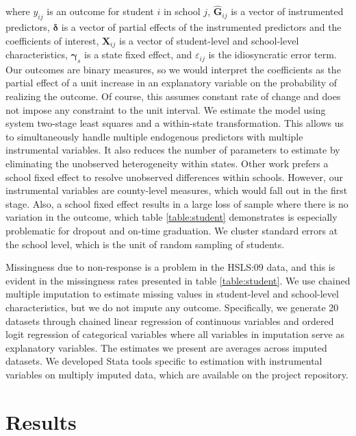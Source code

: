 \documentclass[letterpaper, 12pt]{article}
\begin{document}
where $y_{ij}$ is an outcome for student $i$ in school $j$, $\hat{\mathbf{G}}_{ij}$ is a vector of instrumented predictors, $\boldsymbol{\delta}$ is a vector of partial effects of the instrumented predictors and the coefficients of interest, $\mathbf{X}_{ij}$ is a vector of student-level and school-level characteristics, $\boldsymbol{\gamma}_{s}$ is a state fixed effect, and $\varepsilon_{ij}$ is the idiosyncratic error term. Our outcomes are binary measures, so we would interpret the coefficients as the partial effect of a unit increase in an explanatory variable on the probability of realizing the outcome. Of course, this assumes constant rate of change and does not impose any constraint to the unit interval. We estimate the model using system two-stage least squares and a within-state transformation. This allows us to simultaneously handle multiple endogenous predictors with multiple instrumental variables. It also reduces the number of parameters to estimate by eliminating the unobserved heterogeneity within states. Other work prefers a school fixed effect to resolve unobserved differences within schools. However, our instrumental variables are county-level measures, which would fall out in the first stage. Also, a school fixed effect results in a large loss of sample where there is no variation in the outcome, which table \ref{table:student} demonstrates is especially problematic for dropout and on-time graduation. We cluster standard errors at the school level, which is the unit of random sampling of students.

Missingness due to non-response is a problem in the HSLS:09 data, and this is evident in the missingness rates presented in table \ref{table:student}. We use chained multiple imputation to estimate missing values in student-level and school-level characteristics, but we do not impute any outcome. Specifically, we generate 20 datasets through chained linear regression of continuous variables and ordered logit regression of categorical variables where all variables in imputation serve as explanatory variables. The estimates we present are averages across imputed datasets. We developed Stata tools specific to estimation with instrumental variables on multiply imputed data, which are available on the project repository.

\section{Results}
\end{document}
